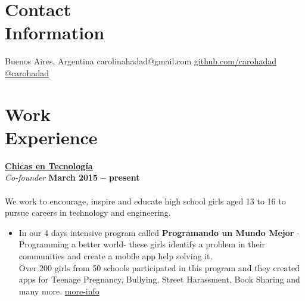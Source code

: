 \documentclass[margin,line]{resume}
\begin{document}
\begin{resume}

\section{\mysidestyle Contact\\Information}

\faMapMarker \vspace{5mm} Buenos Aires, Argentina \hfill
\faEnvelope \vspace{5mm} carolinahadad@gmail.com
\faGithub \vspace{5mm} \href{https://github.com/carohadad}{github.com/carohadad} \hfill
\faTwitter \vspace{5mm} \href{https://twitter.com/carohadad}{@carohadad}

\vspace{-1.5cm}
\section{\mysidestyle Work\\Experience}


\textbf{\href{http://www.chicasentecnologia.org/}{Chicas en Tecnolog\'ia}}\\\vspace{1mm}
\textsl{Co-founder} \hfill \textbf{March 2015 -- present}\vspace{-3mm}\\\vspace{-1mm}
\\
We work to encourage, inspire and educate high school girls aged 13 to 16 to pursue careers in technology and engineering.

\begin{itemize}

\item In our 4 days intensive program called \textbf{Programando un Mundo Mejor} -Programming a better world-  these girls identify a problem in their communities and create a mobile app help solving it.
\\
Over 200 girls from 50 schools participated in this program and they created apps for Teenage Pregnancy, Bullying, Street Harassment, Book Sharing and many more. \href{http://www.chicasentecnologia.org/programando-un-mundo-mejor}{more-info} 


\end{itemize}
\end{resume}
\end{document}
